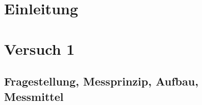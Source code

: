 \documentclass[12pt, oneside, a4paper, \docLanguage]{report}
\begin{document}

\setcounter{section}{0}



\clearpage

%
%


%
%


%
%


%
%




\setcounter{page}{1} 
\pagestyle{default}
%
%
\chapter{Einleitung}
\label{chap:EINL}

\cite{Franz2016n}
\cite{Franz2016e}

%
%
\chapter{Versuch 1}
\label{chap:VERSUCH_1}

\section{Fragestellung, Messprinzip, Aufbau, Messmittel}
\label{chap:VERSUCH_1_FRAGESTELLUNG}
\end{document}
